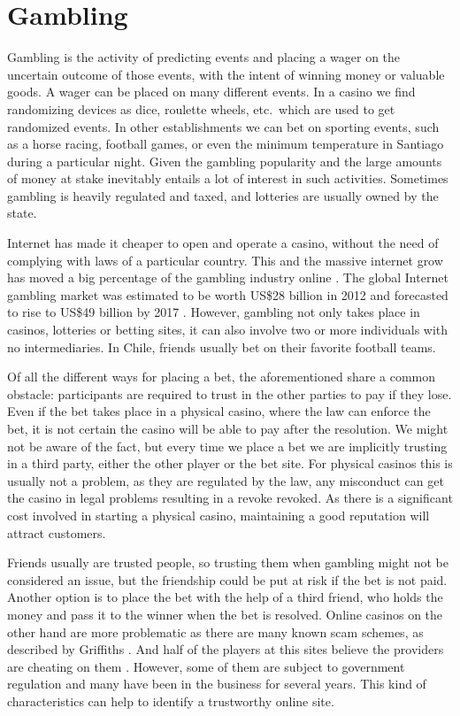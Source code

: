 \section{Gambling} \label{gambling}
Gambling is the activity of predicting events and placing a wager on the
  uncertain outcome of those events, with the intent of winning money or
  valuable goods.
A wager can be placed on many different events. In a casino we find randomizing
  devices as dice, roulette wheels, etc.\ which are used to get randomized
  events. In other establishments we can bet on sporting events, such as a horse
  racing, football games,  or even the minimum temperature in Santiago during a
  particular night.
Given the gambling popularity and the large amounts of money at stake inevitably
  entails a lot of interest in such activities.
Sometimes gambling is heavily regulated and taxed, and lotteries are usually
  owned by the state.

Internet has made it cheaper to open and operate a casino, without the need of
  complying with laws of a particular country.
This and the massive internet grow has moved a big percentage of the gambling
  industry online \cite{shelat2002makes}\cite{griffiths2008internet}.
The global Internet gambling market was estimated to be worth US\$28 billion in
  2012 and forecasted to rise to US\$49 billion by 2017%
  \cite{gainsbury2015risky}.
However, gambling not only takes place in casinos, lotteries or betting sites,
  it can also involve two or more individuals with no intermediaries.
In Chile, friends usually bet on their favorite football teams.

Of all the different ways for placing a bet, the aforementioned share a common
  obstacle: participants are required to trust in the other parties to pay if
  they lose.
Even if the bet takes place in a physical casino, where the law can enforce
  the bet, it is not certain the casino will be able to pay after the
  resolution.
We might not be aware of the fact, but every time we place a bet we are
  implicitly trusting in a third party, either the other player or the bet
  site. For physical casinos this is usually not a problem, as they are
  regulated by the law, any misconduct can get the casino in legal problems
  resulting in a revoke revoked.
As there is a significant cost involved in starting a physical casino,
  maintaining a good reputation will attract customers.

Friends usually are trusted people, so trusting them when gambling might not
  be considered an issue, but the friendship could be put at risk if the bet
  is not paid. Another option is to place the bet with the help  of a third
  friend, who holds the money and pass it to the winner when the bet is
  resolved.
Online casinos on the other hand are more problematic as there are many known
  scam schemes, as described by Griffiths \cite{griffiths2010crime}. And
  half of the players at this sites believe the providers are cheating on
  them \cite{mcmullan2010online}. However, some of them are subject to
  government regulation and many have been in the business for several years.
This kind of characteristics can help to identify a trustworthy online site.

